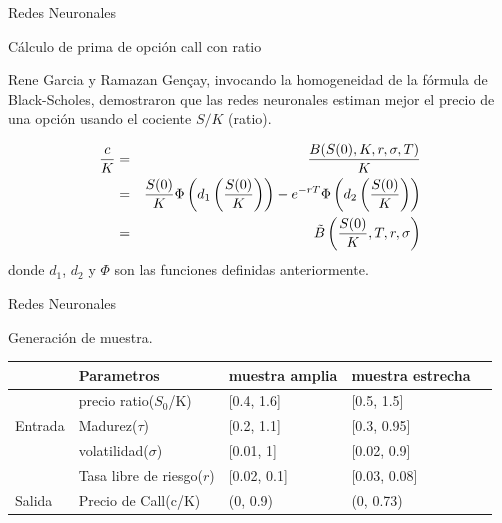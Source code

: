 \documentclass{beamer}
\begin{document}
\begin{frame}{Redes Neuronales}

    \begin{block}{C\'alculo de prima de opci\'on call con ratio}
        
        Rene Garcia y Ramazan Gen\c{c}ay, invocando la homogeneidad de la f\'ormula de Black-Scholes,
        demostraron que las redes neuronales estiman mejor el precio de una opci\'on usando el cociente $S/K$ (ratio).

        \begin{eqnarray}
            \frac{c}{K} &=& \frac{B(S(0),K,r,\sigma,T)}{K}\\
            & =& \frac{S(0)}{K}\Phi\left(d_1\left(\frac {S(0)}K\right)\right) - e^{-rT}\Phi\left(d_2\left(\frac {S(0)}K\right)\right)\\
              & =& \tilde B\left(\frac{S(0)}K, T, r, \sigma\right)\notag
            \label{c2}
        \end{eqnarray}
%
        donde $d_1$, $d_2$ y $\Phi$ son las funciones definidas anteriormente.


    \end{block}

\end{frame}

\begin{frame}{Redes Neuronales}

  Generaci\'on de muestra.

    \begin{table}[!htbp]
        \begin{center}
        \begin{tabular}{|l|l|l|l|l|}
            \hline
             & Parametros & muestra amplia  &  muestra estrecha   \\ \hline
              & precio ratio($S_0$/K) & [0.4, 1.6] & [0.5, 1.5]   \\ \cline{2-4} 
             Entrada & Madurez($\tau$) &  [0.2, 1.1] & [0.3, 0.95]   \\ \cline{2-4} 
              & volatilidad($\sigma$) &  [0.01, 1] & [0.02, 0.9]  \\ \cline{2-4} 
              & Tasa libre de riesgo($r$) &  [0.02, 0.1] & [0.03, 0.08] \\ \hline
             Salida & Precio de Call(c/K) &  (0, 0.9) & (0, 0.73) \\ \hline
        \end{tabular}
        \end{center}
    \end{table} 

  

\end{frame}
\end{document}
